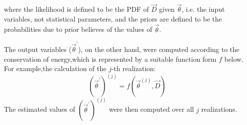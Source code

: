 where the likelihood is defined to be the PDF of $\vec{D}$ given $\vec{\theta}$,
i.e. the input variables, not statistical parameters, and the priors are
defined to be the probabilities due to prior believes of the values of
$\vec{\theta}$.\par
The output variables ($\vec{\theta}^\prime$), on the other hand, were computed
according to the conservation of energy,which is represented by a suitable
function form $f$ below.
 For example,the calculation of
the $j$-th realization: 
\begin{equation}
    (\vec{\theta}^\prime)^{(j)} = f(\vec{\theta}^{(j)}, \vec{D}) 
\end{equation}    
The estimated values of $(\vec{\theta}^\prime)^{(j)}$ were then computed
over all $j$ realizations.


